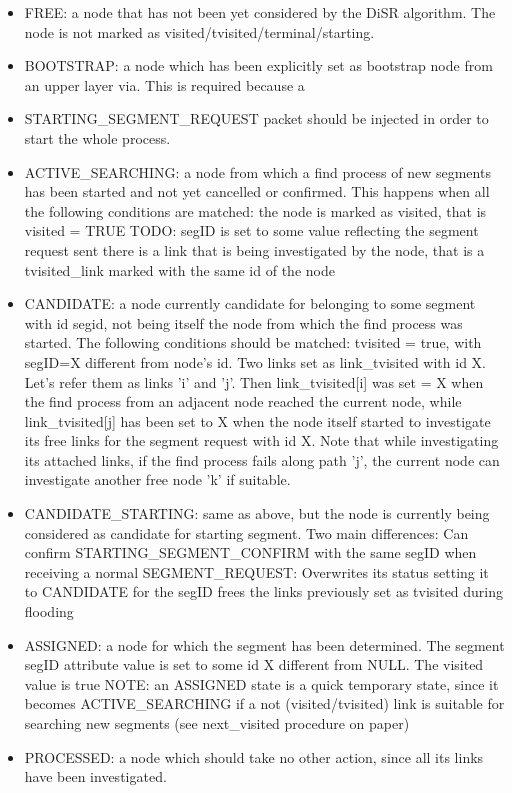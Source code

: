 \documentclass[final,journal,letterpaper]{IEEEtran}
\begin{document}
\begin{itemize}
\item{FREE}: a node that has  not been yet considered  by the DiSR algorithm.
The node is not marked as visited/tvisited/terminal/starting.
\item{BOOTSTRAP}: a node which has been explicitly set as bootstrap node from
an upper layer via. This is required because a
\item{STARTING\_SEGMENT\_REQUEST} packet should be injected in order to start
the whole process.
\item{ACTIVE\_SEARCHING}: a node from which a find process of new segments has
been started and not yet cancelled or confirmed. This happens when all
the following conditions are matched: the node is marked as visited,
that is visited = TRUE 
TODO: segID is set to some value reflecting
the segment request sent there is a link that is being investigated by
the node, that is a tvisited\_link marked with the same id of the node 
\item{CANDIDATE}: a node currently candidate for belonging to some segment
with id segid, not being itself the node from which the find process
was started. The following conditions should be matched: tvisited =
true, with segID=X different from node's id.  Two links set as
link\_tvisited with id X. Let’s refer them as  links 'i' and 'j'. Then
link\_tvisited[i] was set = X when the find process from an adjacent
node reached the current node, while link\_tvisited[j] has been set to
X when the node itself started to investigate its free links for the
segment request with id X. Note that while investigating its attached
links, if the find process fails along path 'j', the current node can
investigate another free node 'k' if suitable.  
\item{CANDIDATE\_STARTING}: same as above, but the node is currently being considered as candidate
for starting segment. Two main differences: Can confirm
STARTING\_SEGMENT\_CONFIRM with the same segID when receiving a normal
SEGMENT\_REQUEST: Overwrites its status setting it to CANDIDATE for the
segID frees the links previously set as tvisited during flooding
\item{ASSIGNED}: a node for which the segment has been determined.  The
segment segID attribute value is set to some id X different from NULL.
The visited value is true NOTE: an ASSIGNED state is a quick temporary
state, since it becomes ACTIVE\_SEARCHING if a not (visited/tvisited)
link is suitable for searching new segments (see next\_visited
procedure on paper) 
\item{PROCESSED}: a node which should take no other
action, since all its links have been investigated. 
\end{itemize}
\end{document}
